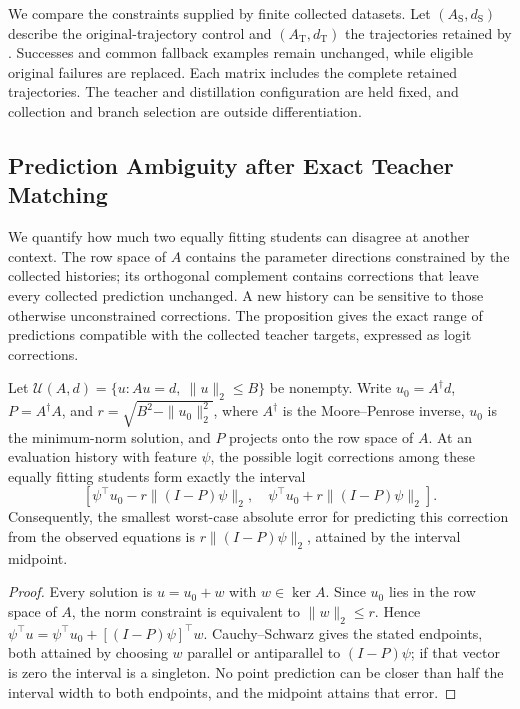 We compare the constraints supplied by finite collected datasets. Let $(A_{\mathrm S},d_{\mathrm S})$ describe the original-trajectory control and $(A_{\mathrm T},d_{\mathrm T})$ the trajectories retained by \method{}. Successes and common fallback examples remain unchanged, while eligible original failures are replaced. Each matrix includes the complete retained trajectories. The teacher and distillation configuration are held fixed, and collection and branch selection are outside differentiation. 


\subsection{Prediction Ambiguity after Exact Teacher Matching}
\label{app:ident-ambiguity}

{We quantify how much two equally fitting students can disagree at another context.} The row space of $A$ contains the parameter directions constrained by the collected histories; its orthogonal complement contains corrections that leave every collected prediction unchanged. A new history can be sensitive to those otherwise unconstrained corrections. The proposition gives the exact range of predictions compatible with the collected teacher targets, expressed as logit corrections.

\begin{proposition}
\label{prop:ident-ambiguity}
Let $\mathcal U(A,d)=\{u:Au=d,\ \|u\|_2\leq B\}$ be nonempty. Write $u_0=A^\dagger d$, $P=A^\dagger A$, and $r=\sqrt{B^2-\|u_0\|_2^2}$, where $A^\dagger$ is the Moore--Penrose inverse, $u_0$ is the minimum-norm solution, and $P$ projects onto the row space of $A$. At an evaluation history with feature $\psi$, the possible logit corrections among these equally fitting students form exactly the interval
\begin{equation}
\left[\psi^\top u_0-r\|(I-P)\psi\|_2,\quad
\psi^\top u_0+r\|(I-P)\psi\|_2\right].
\label{eq:ident-interval}
\end{equation}
Consequently, the smallest worst-case absolute error for predicting this correction from the observed equations is $r\|(I-P)\psi\|_2$, attained by the interval midpoint.
\end{proposition}

\begin{proof}
Every solution is $u=u_0+w$ with $w\in\ker A$. Since $u_0$ lies in the row space of $A$, the norm constraint is equivalent to $\|w\|_2\leq r$. Hence $\psi^\top u=\psi^\top u_0+[(I-P)\psi]^\top w$. Cauchy--Schwarz gives the stated endpoints, both attained by choosing $w$ parallel or antiparallel to $(I-P)\psi$; if that vector is zero the interval is a singleton. No point prediction can be closer than half the interval width to both endpoints, and the midpoint attains that error.
\end{proof}


